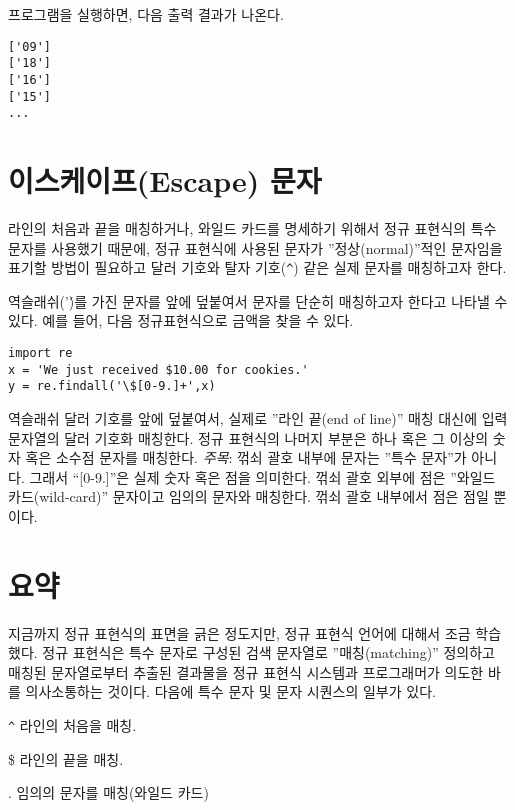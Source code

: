 프로그램을 실행하면, 다음 출력 결과가 나온다.

\beforeverb
\begin{verbatim}
['09']
['18']
['16']
['15']
...
\end{verbatim}
\afterverb
%

\section{이스케이프(Escape) 문자}

라인의 처음과 끝을 매칭하거나, 와일드 카드를 명세하기 위해서 정규 표현식의 특수 문자를 사용했기 때문에,
정규 표현식에 사용된 문자가 ''정상(normal)''적인 문자임을 표기할 방법이 필요하고
달러 기호와 탈자 기호({\verb"^"}) 같은 실제 문자를 매칭하고자 한다.

역슬래쉬('\')를 가진 문자를 앞에 덮붙여서 문자를 단순히 매칭하고자 한다고 나타낼 수 있다.
예를 들어, 다음 정규표현식으로 금액을 찾을 수 있다.

\beforeverb
\begin{verbatim}
import re
x = 'We just received $10.00 for cookies.'
y = re.findall('\$[0-9.]+',x)
\end{verbatim}
\afterverb
%

역슬래쉬 달러 기호를 앞에 덮붙여서, 실제로 ''라인 끝(end of line)'' 매칭 대신에 입력 문자열의 달러 기호화 매칭한다.
정규 표현식의 나머지 부분은 하나 혹은 그 이상의 숫자 혹은 소수점 문자를 매칭한다.
{\em 주목}: 꺾쇠 괄호 내부에 문자는 ''특수 문자''가 아니다. 그래서 ``[0-9.]''은 실제 숫자 혹은 점을 의미한다.
꺾쇠 괄호 외부에 점은 ''와일드 카드(wild-card)'' 문자이고 임의의 문자와 매칭한다. 꺾쇠 괄호 내부에서 점은 점일 뿐이다.

\section{요약}

지금까지 정규 표현식의 표면을 긁은 정도지만, 정규 표현식 언어에 대해서 조금 학습했다.
정규 표현식은 특수 문자로 구성된 검색 문자열로 ''매칭(matching)'' 정의하고 매칭된 문자열로부터 추출된 결과물을 정규 표현식 시스템과
프로그래머가 의도한 바를 의사소통하는 것이다.
다음에 특수 문자 및 문자 시퀀스의 일부가 있다.

\verb"^" \newline
라인의 처음을 매칭.

\$ \newline
라인의 끝을 매칭.

. \newline
임의의 문자를 매칭(와일드 카드)

